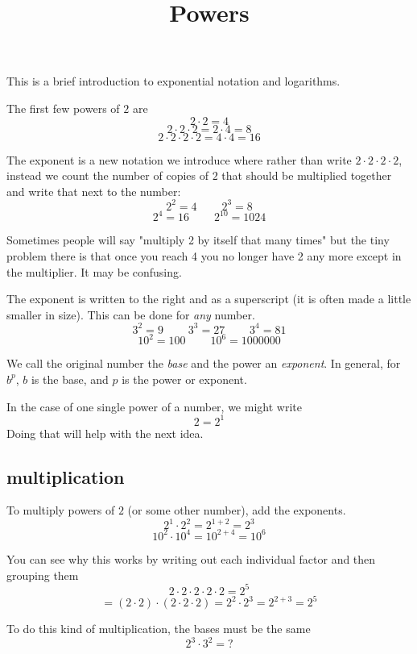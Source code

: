 \documentclass[11pt, oneside]{article}
\title{Powers}
\date{}
\begin{document}
\maketitle
\Large


This is a brief introduction to exponential notation and logarithms.

The first few powers of $2$ are
\[ 2 \cdot 2 = 4 \]
\[ 2 \cdot 2 \cdot 2 = 2 \cdot 4 = 8 \]
\[ 2 \cdot 2 \cdot 2 \cdot 2 = 4 \cdot 4 = 16 \]

The exponent is a new notation we introduce where rather than write $2 \cdot 2 \cdot 2 \cdot 2$, instead we count the number of copies of $2$ that should be multiplied together and write that next to the number:
\[ 2^2 = 4 \ \ \ \ \ \ \ \ \ \ 2^3 = 8 \]
\[ 2^4 = 16 \ \ \ \ \ \ \ \ \ \ 2^{10} = 1024 \]

Sometimes people will say "multiply 2 by itself that many times" but the tiny problem there is that once you reach 4 you no longer have 2 any more except in the multiplier.  It may be confusing.

The exponent is written to the right and as a superscript (it is often made a little smaller in size).  This can be done for \emph{any} number.
\[ 3^2 = 9 \ \ \ \ \ \ \ \ \ \ 3^3 = 27 \ \ \ \ \ \ \ \ \ \ 3^4 = 81 \]
\[ 10^2 = 100 \ \ \ \ \ \ \ \ \ \ 10^6 = 1000000 \]

We call the original number the \emph{base} and the power an \emph{exponent}.  In general, for $b^p$,
$b$ is the base, and $p$ is the power or exponent.

In the case of one single power of a number, we might write
\[ 2 = 2^1 \]
Doing that will help with the next idea.

\subsection*{multiplication}

To multiply powers of $2$ (or some other number), add the exponents.
\[ 2^1 \cdot 2^2 = 2^{1+2} = 2^3 \]
\[ 10^2 \cdot 10^4 = 10^{2+4} = 10^6 \]

You can see why this works by writing out each individual factor and then grouping them
\[ 2 \cdot 2 \cdot 2 \cdot 2 \cdot 2 = 2^5 \]
\[ = (2 \cdot 2) \cdot (2 \cdot 2 \cdot 2) = 2^2 \cdot 2^3 = 2^{2 + 3} = 2^5 \]

To do this kind of multiplication, the bases must be the same
\[ 2^3 \cdot 3^2 = \text{?} \]
\end{document}
